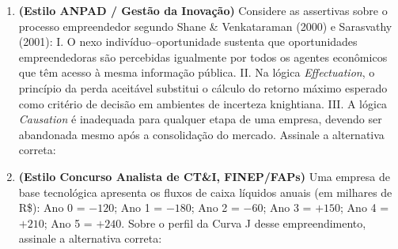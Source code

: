 
\begin{enumerate}[leftmargin=1.5em, itemsep=6pt]
  \item \textbf{(Estilo ANPAD / Gestão da Inovação)} Considere as assertivas sobre o processo empreendedor segundo Shane \& Venkataraman (2000) e Sarasvathy (2001):
  I. O nexo indivíduo–oportunidade sustenta que oportunidades empreendedoras são percebidas igualmente por todos os agentes econômicos que têm acesso à mesma informação pública.
  II. Na lógica \textit{Effectuation}, o princípio da perda aceitável substitui o cálculo do retorno máximo esperado como critério de decisão em ambientes de incerteza knightiana.
  III. A lógica \textit{Causation} é inadequada para qualquer etapa de uma empresa, devendo ser abandonada mesmo após a consolidação do mercado.
  Assinale a alternativa correta:
  \espacoResolucao[1.5cm]

  \item \textbf{(Estilo Concurso Analista de CT\&I, FINEP/FAPs)} Uma empresa de base tecnológica apresenta os fluxos de caixa líquidos anuais (em milhares de R\$): Ano 0 = $-120$; Ano 1 = $-180$; Ano 2 = $-60$; Ano 3 = $+150$; Ano 4 = $+210$; Ano 5 = $+240$. Sobre o perfil da Curva J desse empreendimento, assinale a alternativa correta:
  \espacoResolucao[1.6cm]


\end{enumerate}
